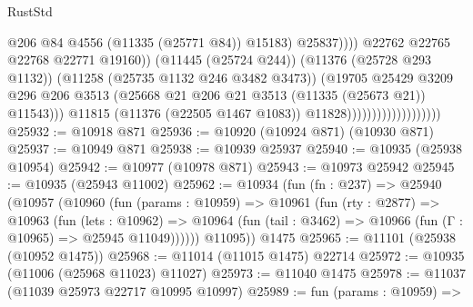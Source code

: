 \begin{lexlean}{RustStd}
\begin{coremodule}
{{{{{{{{{{{{{{{{{{{                                                          @206
                                                          @84
                                                          @4556
                                                          (@11335 (@25771 @84))
                                                          @15183)
                                                        @25837))))
                                                @22762
                                                @22765
                                                @22768
                                                @22771
                                                @19160))
                                            (@11445 (@25724 @244))
                                            (@11376 (@25728 @293 @1132))
                                            (@11258 (@25735 @1132 @246 @3482 @3473))
                                            (@19705
                                              @25429
                                              @3209
                                              @296
                                              @206
                                              @3513
                                              (@25668
                                                @21
                                                @206
                                                @21
                                                @3513
                                                (@11335 (@25673 @21))
                                                @11543)))
                                          @11815
                                          (@11376 (@22505 @1467 @1083))
                                          @11828)))))))))))))))))))
@25932 := @10918 @871
@25936 := @10920 (@10924 @871) (@10930 @871)
@25937 := @10949 @871
@25938 := @10939 @25937
@25940 := @10935 (@25938 @10954)
@25942 := @10977 (@10978 @871)
@25943 := @10973 @25942
@25945 := @10935 (@25943 @11002)
@25962 := @10934
    (fun (fn : @237) =>
    @25940
      (@10957
        (@10960
          (fun (params : @10959) =>
          @10961
            (fun (rty : @2877) =>
            @10963
              (fun (lets : @10962) =>
              @10964 (fun (tail : @3462) => @10966 (fun (Γ : @10965) => @25945 @11049))))))
        @11095))
    @1475
@25965 := @11101 (@25938 (@10952 @1475))
@25968 := @11014 (@11015 @1475) @22714
@25972 := @10935 (@11006 (@25968 @11023) @11027)
@25973 := @11040 @1475
@25978 := @11037 (@11039 @25973 @22717 @10995 @10997)
@25989 := fun (params : @10959) =>
}}}}}}}}}}}}}}}}}}}
\end{coremodule}
\end{lexlean}
